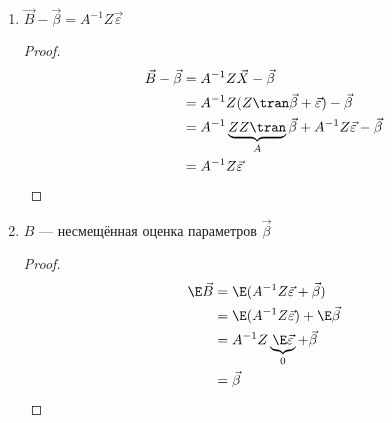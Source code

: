 \begin{prop}\itemfix
    \begin{enumerate}
        \item \(\vec{B} - \vec{\beta} = A^{-1} Z \vec{\varepsilon}\)
              \begin{proof}
                  \begin{align*}
                      \vec{B} - \vec{\beta}
                       & = A^{-1}Z \vec{X} - \vec{\beta}                                                           \\
                       & = A^{-1}Z (Z\tran \vec{\beta} + \vec{\varepsilon}) - \vec{\beta}                          \\
                       & = A^{-1} \underbrace{Z Z\tran}_{A} \vec{\beta} + A^{-1} Z \vec{\varepsilon} - \vec{\beta} \\
                       & = A^{-1} Z \vec{\varepsilon}                                                              \\
                  \end{align*}
              \end{proof}
        \item \(B\) --- несмещённая оценка параметров \(\vec{\beta}\)
              \begin{proof}
                  \begin{align*}
                      \E \vec{B}
                       & = \E(A^{-1}Z \vec{\varepsilon} + \vec{\beta})              \\
                       & = \E(A^{-1}Z \vec{\varepsilon}) + \E\vec{\beta}            \\
                       & = A^{-1}Z \underbrace{\E\vec{\varepsilon}}_0 + \vec{\beta} \\
                       & = \vec{\beta}
                  \end{align*}
              \end{proof}


\end{enumerate}
\end{prop}
